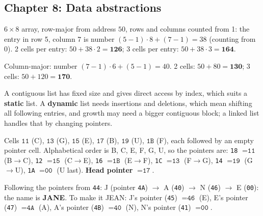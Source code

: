 \documentclass{fkt-notes}
\newcommand{\hx}[1]{\texttt{#1}}
\begin{document}
\subsection*{Chapter 8: Data abstractions}
\begin{description}[leftmargin=0pt,labelindent=0pt,itemsep=2pt]
  \item[8.2] $6\times8$ array, row-major from address $50$, rows and columns counted from 1: the entry in row 5, column 7 is number $(5-1)\cdot8+(7-1)=38$ (counting from 0). 2 cells per entry: $50+38\cdot2=\mathbf{126}$; 3 cells per entry: $50+38\cdot3=\mathbf{164}$.
  \item[8.3] Column-major: number $(7-1)\cdot6+(5-1)=40$. 2 cells: $50+80=\mathbf{130}$; 3 cells: $50+120=\mathbf{170}$.
  \item[8.5] A contiguous list has fixed size and gives direct access by index, which suits a \textbf{static} list. A \textbf{dynamic} list needs insertions and deletions, which mean shifting all following entries, and growth may need a bigger contiguous block; a linked list handles that by changing pointers.
  \item[8.7] Cells $\hx{11}$ (C), $\hx{13}$ (G), $\hx{15}$ (E), $\hx{17}$ (B), $\hx{19}$ (U), $\hx{1B}$ (F), each followed by an empty pointer cell. Alphabetical order is B, C, E, F, G, U, so the pointers are: \hx{18} $=\hx{11}$ (B$\to$C), \hx{12} $=\hx{15}$ (C$\to$E), \hx{16} $=\hx{1B}$ (E$\to$F), \hx{1C} $=\hx{13}$ (F$\to$G), \hx{14} $=\hx{19}$ (G$\to$U), \hx{1A} $=\hx{00}$ (U last). \textbf{Head pointer} $=\hx{17}$.
  \item[8.9 (the linked list at head 0x44)] Following the pointers from \hx{44}: J (pointer \hx{4A}) $\to$ A (\hx{40}) $\to$ N (\hx{46}) $\to$ E (\hx{00}): the name is \textbf{JANE}. To make it JEAN: J's pointer (\hx{45}) $=\hx{46}$ (E), E's pointer (\hx{47}) $=\hx{4A}$ (A), A's pointer (\hx{4B}) $=\hx{40}$ (N), N's pointer (\hx{41}) $=\hx{00}$.
\end{description}
\end{document}
